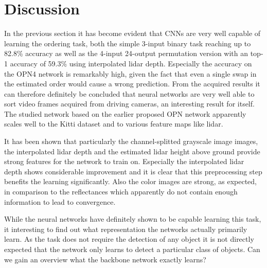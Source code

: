%
\newpage
\chapter{Discussion}
\label{ch:discussion}
In the previous section it has become evident that CNNs are very well capable of learning the ordering task, both the simple 3-input binary task reaching up to 82.8\% accuracy as well as the 4-input 24-output permutation version with an top-1 accuracy of 59.3\% using interpolated lidar depth. Especially the accuracy on the OPN4 network is remarkably high, given the fact that even a single swap in the estimated order would cause a wrong prediction. From the acquired results it can therefore definitely be concluded that neural networks are very well able to sort video frames acquired from driving cameras, an interesting result for itself. The studied network based on the earlier proposed OPN network \cite{lee2017} apparently scales well to the Kitti dataset and to various feature maps like lidar.

It has been shown that particularly the channel-splitted grayscale image images, the interpolated lidar depth and the estimated lidar height above ground provide strong features for the network to train on. Especially the interpolated lidar depth shows considerable improvement and it is clear that this preprocessing step benefits the learning significantly. Also the color images are strong, as expected, in comparison to the reflectances which apparently do not contain enough information to lead to convergence.


While the neural networks have definitely shown to be capable learning this task, it interesting to find out what representation the networks actually primarily learn. As the task does not require the detection of any object it is not directly expected that the network only learns to detect a particular class of objects. Can we gain an overview what the backbone network exactly learns? 

